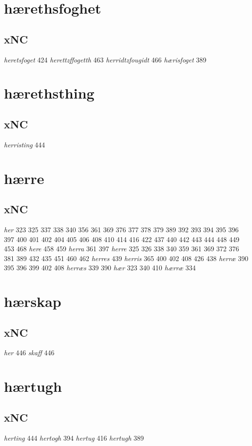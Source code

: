 \documentclass[a4paper,twocolumn]{article}
\begin{document}
\section{hærethsfoghet}
\label{sec:org1c22e7e}
\subsection{xNC}
\label{sec:orga52facb}
\emph{heretsfoget} 424 \emph{herettzffogetth} 463 \emph{herridtzfougidt} 466 \emph{hærisfoget} 389 
\section{hærethsthing}
\label{sec:orgd09b85d}
\subsection{xNC}
\label{sec:org6870eba}
\emph{herristing} 444 
\section{hærre}
\label{sec:org30dad9f}
\subsection{xNC}
\label{sec:org366463b}
\emph{her} 323 325 337 338 340 356 361 369 376 377 378 379 389 392 393 394 395 396 397 400 401 402 404 405 406 408 410 414 416 422 437 440 442 443 444 448 449 453 468 \emph{here} 458 459 \emph{herra} 361 397 \emph{herre} 325 326 338 340 359 361 369 372 376 381 389 432 435 451 460 462 \emph{herres} 439 \emph{herris} 365 400 402 408 426 438 \emph{herræ} 390 395 396 399 402 408 \emph{herræs} 339 390 \emph{hær} 323 340 410 \emph{hærræ} 334 
\section{hærskap}
\label{sec:orgf76465f}
\subsection{xNC}
\label{sec:org115d5be}
\emph{her} 446 \emph{skaff} 446 
\section{hærtugh}
\label{sec:orgdc79804}
\subsection{xNC}
\label{sec:org6da06aa}
\emph{herting} 444 \emph{hertogh} 394 \emph{hertug} 416 \emph{hertugh} 389 
\end{document}
